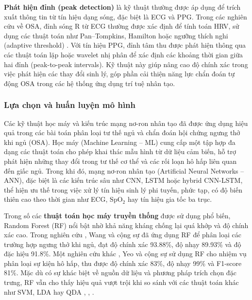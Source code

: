 \textbf{Phát hiện đỉnh (peak detection)} là kỹ thuật thường được áp dụng 
để trích xuất thông tin từ tín hiệu dạng sóng, đặc biệt là ECG và PPG. 
Trong các nghiên cứu về OSA, đỉnh sóng R từ ECG thường được xác định 
để tính toán HRV, sử dụng các thuật toán như Pan–Tompkins, Hamilton 
hoặc ngưỡng thích nghi (adaptive threshold) \cite{osa_sanchez2025}. Với tín hiệu PPG, 
đỉnh tâm thu được phát hiện thông qua các thuật toán lặp hoặc 
wavelet nhị phân để xác định các khoảng thời gian giữa hai đỉnh 
(peak-to-peak intervals). Kỹ thuật này giúp nâng cao độ chính xác 
trong việc phát hiện các thay đổi sinh lý, góp phần cải thiện năng 
lực chẩn đoán tự động OSA trong các hệ thống ứng dụng trí tuệ nhân tạo.


\subsubsection{Lựa chọn và huấn luyện mô hình}
Các kỹ thuật học máy và kiến trúc mạng nơ-ron nhân tạo đã được 
ứng dụng hiệu quả trong các bài toán phân loại tư thế ngủ và chẩn đoán 
hội chứng ngưng thở khi ngủ (OSA). Học máy (Machine Learning – ML) cung 
cấp một tập hợp đa dạng các thuật toán cho phép khai thác mẫu hình từ 
dữ liệu cảm biến, hỗ trợ phát hiện những thay đổi trong tư thế cơ thể 
và các rối loạn hô hấp liên quan đến giấc ngủ. Trong khi đó, mạng nơ-ron 
nhân tạo (Artificial Neural Networks – ANN), đặc biệt là các kiến trúc 
sâu như CNN, LSTM hoặc hybrid CNN-LSTM, thể hiện ưu thế trong việc xử 
lý tín hiệu sinh lý phi tuyến, phức tạp, có độ biến thiên cao theo thời 
gian như ECG, $\mathrm{SpO_2}$ hay tín hiệu gia tốc ba trục.

Trong số các \textbf{thuật toán học máy truyền thống} được sử dụng phổ biến, 
Random Forest (RF) \cite{genuer2020random} nổi bật nhờ khả năng kháng chống lại quá khớp và độ chính xác cao. 
Trong nghiên cứu \cite{wang2023ml_wearable}, Wang và cộng sự đã ứng dụng RF để phân loại các trường hợp ngưng thở khi ngủ, đạt độ chính xác 93.88\%, độ nhạy 89.93\% và độ đặc hiệu 91.8\%. 
Một nghiên cứu khác \cite{yeo2022respiratory}, Yeo và cộng sự sử dụng RF cho nhiệm vụ phân loại sự kiện hô hấp, thu được độ chính xác 83\%, độ nhạy 99\% và F1-score 81\%. 
Mặc dù có sự khác biệt về nguồn dữ liệu và phương pháp trích chọn đặc trưng, RF vẫn cho thấy hiệu quả vượt trội khi 
so sánh với các thuật toán khác như SVM, LDA hay QDA \cite{wang2023ml_wearable}, \cite{yeo2022respiratory}, \cite{parbat2024multiscale}.

